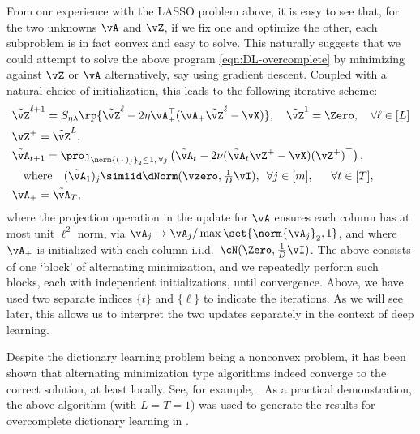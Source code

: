 \documentclass[../../book-main.tex]{subfiles}
\begin{document}
    From our experience with the LASSO problem above, it is easy to
    see that, for
    the two unknowns \(\vA\) and \(\vZ\), if we fix one and optimize
    the other, each
    subproblem is in fact convex and easy to solve. This naturally
    suggests that we
    could attempt to solve the above program \eqref{eqn:DL-overcomplete} by
    minimizing against \(\vZ\) or \(\vA\) alternatively, say using
    gradient descent.
    Coupled with a natural choice of initialization, this leads to the following
    iterative scheme:
    \begin{align}
        &\tilde{\vZ}^{\ell + 1} = S_{\eta\lambda}\rp{\tilde{\vZ}^{\ell}
        - 2\eta\vA_{+}^{\top}(\vA_{+}\tilde{\vZ}^{\ell} - \vX)},
        \quad \tilde{\vZ}^1 = \Zero,
        \quad \forall \ell \in [L] \label{eqn:ISTA-update}\\
        &\vZ^+ = \tilde{\vZ}^L,\\
        &\tilde{\vA}_{t + 1} = \proj_{\norm{(\,\cdot\,)_j}_2 \leq
        1,\,\forall j}\left(
            \tilde{\vA}_{t} - 2\nu (\tilde{\vA}_{t}\vZ^+ - \vX)(\vZ^+)^\top
        \right), \nonumber \\
        &\quad\mbox{where} \quad (\tilde{\vA}_{1})_j \simiid \dNorm(\vzero,
        \tfrac{1}{D}\vI), \enspace \forall
        j \in [m],
        \quad\;\; \forall t \in [T],\label{eqn:DL-update}\\
        &\vA_+ = \tilde{\vA}_T,
    \end{align}
    where the projection operation in the update for $\vA$ ensures
    each column has
    at most unit $\ell^2$ norm, via $\vA_j \mapsto \vA_j / \max
    \set{\norm{\vA_j}_2,
    1}$, and where $\vA_+$ is initialized with each column i.i.d.\ $\cN(\Zero,
    \tfrac{1}{D} \vI)$.
    The above consists of one `block' of alternating minimization,
    and we repeatedly
    perform such blocks, each with independent initializations, until
    convergence.
    Above, we have used two separate indices $\{t\}$ and $\{\ell\}$
    to indicate the
    iterations. As we will see later, this allows us to interpret the
    two updates
    separately in the context of deep learning.

    Despite the dictionary learning problem being a nonconvex
    problem, it has been
    shown that alternating minimization type algorithms indeed converge to
    the correct solution, at least locally. See, for example, \cite{alekh-2016}.
    As a practical demonstration, the above algorithm (with $L = T =
    1$) was used to
    generate the results for overcomplete dictionary learning in
    .
\end{document}
